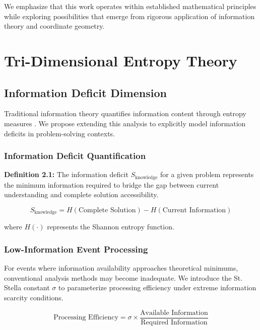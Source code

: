 \documentclass[11pt]{article}
\begin{document}
We emphasize that this work operates within established mathematical principles while exploring possibilities that emerge from rigorous application of information theory and coordinate geometry.

\section{Tri-Dimensional Entropy Theory}

\subsection{Information Deficit Dimension}

Traditional information theory quantifies information content through entropy measures \cite{shannon1948mathematical}. We propose extending this analysis to explicitly model information deficits in problem-solving contexts.

\subsubsection{Information Deficit Quantification}

\textbf{Definition 2.1:} The information deficit $S_{\text{knowledge}}$ for a given problem represents the minimum information required to bridge the gap between current understanding and complete solution accessibility.

\begin{equation}
S_{\text{knowledge}} = H(\text{Complete Solution}) - H(\text{Current Information})
\label{eq:information_deficit}
\end{equation}

where $H(\cdot)$ represents the Shannon entropy function.

\subsubsection{Low-Information Event Processing}

For events where information availability approaches theoretical minimums, conventional analysis methods may become inadequate. We introduce the St. Stella constant $\sigma$ to parameterize processing efficiency under extreme information scarcity conditions.

\begin{equation}
\text{Processing Efficiency} = \sigma \times \frac{\text{Available Information}}{\text{Required Information}}
\label{eq:stella_constant}
\end{equation}
\end{document}
